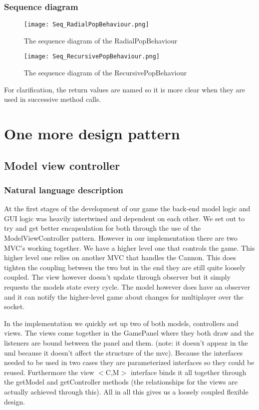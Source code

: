 \documentclass[a4paper]{article}
\begin{document}
\subsubsection{Sequence diagram}
\begin{figure}[H]
    \texttt{[image: Seq\_RadialPopBehaviour.png]}
    \caption{\label{fig:seq_strategy1} The sequence diagram of the RadialPopBehaviour}
\end{figure}
\begin{figure}[H]
    \texttt{[image: Seq\_RecursivePopBehaviour.png]}
    \caption{\label{fig:seq_strategy2} The sequence diagram of the RecursivePopBehaviour}
\end{figure}
For clarification, the return values are named so it is more clear when they are used in successive method calls.

\section{One more design pattern}

\subsection{Model view controller}

\subsubsection{Natural language description}
At the first stages of the development of our game the back-end model logic and GUI logic was heavily intertwined and dependent on each other. We set out to try and get better encapsulation for both through the use of the ModelViewController pattern. However in our implementation there are two MVC's working together. We have a higher level one that controls the game. This higher level one relies on another MVC that handles the Cannon. This does tighten the coupling between the two but in the end they are still quite loosely coupled. The view however doesn't update through observer but it simply requests the models state every cycle. The model however does have an observer and it can notify the higher-level game about changes for multiplayer over the socket.

In the implementation we quickly set up two of both models, controllers and views. The views come together in the GamePanel where they both draw and the listeners are bound between the panel and them. (note: it doesn't appear in the uml because it doesn't affect the structure of the mvc). Because the interfaces needed to be used in two cases they are parameterized interfaces so they could be reused. Furthermore the view $<$C,M$>$ interface binds it all together through the getModel and getController methods (the relationships for the views are actually achieved through this). All in all this gives us a loosely coupled flexible design.
\end{document}
